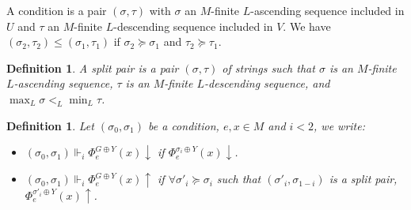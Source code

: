 \documentclass{article}
\numberwithin{theorem}{section}
\newtheorem{definition}[theorem]{Definition}
\begin{document}
A condition is a pair $(\sigma, \tau)$ with $\sigma$ an $M$-finite $L$-ascending sequence included in $U$ and $\tau$ an $M$-finite $L$-descending sequence included in $V$. We have $(\sigma_2, \tau_2) \leq (\sigma_1, \tau_1)$ if $\sigma_2 \succeq \sigma_1$ and $\tau_2 \succeq \tau_1$.

\begin{definition}
A \emph{split pair} is a pair $(\sigma, \tau)$ of strings such that $\sigma$ is an $M$-finite $L$-ascending sequence, $\tau$ is an $M$-finite $L$-descending sequence, and $\max_L \sigma <_L \min_L \tau$.
\end{definition}

\begin{definition}
Let $(\sigma_0, \sigma_1)$ be a condition, $e, x \in M$ and $i < 2$, we write:
\begin{itemize}
    \item $(\sigma_0, \sigma_1) \Vdash_i \Phi_e^{G \oplus Y}(x) \downarrow$ if $\Phi_e^{\sigma_i \oplus Y}(x) \downarrow$. 
    \item $(\sigma_0, \sigma_1) \Vdash_i \Phi_e^{G \oplus Y}(x) \uparrow$ if $\forall \sigma'_i \succeq \sigma_i$ such that $(\sigma'_i, \sigma_{1-i})$ is a split pair, $\Phi_e^{\sigma'_i \oplus Y}(x)\uparrow$.
\end{itemize}   
\end{definition}
\end{document}
